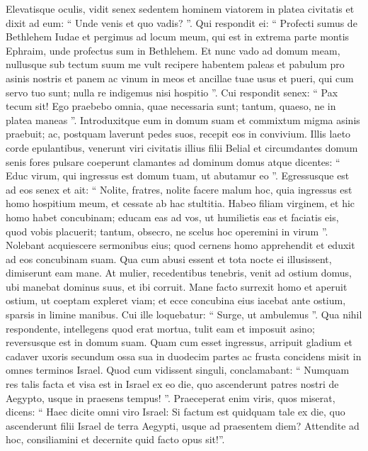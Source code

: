 \begin{biblechapter}
\begin{biblechapter}
\begin{biblechapter}
\begin{biblechapter}
\begin{biblechapter}
\begin{biblechapter}
\begin{biblechapter}
\begin{biblechapter}
\begin{biblechapter}
\begin{biblechapter}
\begin{biblechapter}
\begin{biblechapter}
\begin{biblechapter}
\begin{biblechapter}
\begin{biblechapter}
\begin{biblechapter}
\begin{biblechapter}
\begin{biblechapter}
\begin{biblechapter}
\verse Elevatisque oculis, vidit senex sedentem hominem viatorem in platea civitatis et dixit ad eum: “ Unde venis et quo vadis? ”. 
\verse Qui respondit ei: “ Profecti sumus de Bethlehem Iudae et pergimus ad locum meum, qui est in extrema parte montis Ephraim, unde profectus sum in Bethlehem. Et nunc vado ad domum meam, nullusque sub tectum suum me vult recipere 
\verse habentem paleas et pabulum pro asinis nostris et panem ac vinum in meos et ancillae tuae usus et pueri, qui cum servo tuo sunt; nulla re indigemus nisi hospitio ”. 
\verse Cui respondit senex: “ Pax tecum sit! Ego praebebo omnia, quae necessaria sunt; tantum, quaeso, ne in platea maneas ”. 
\verse Introduxitque eum in domum suam et commixtum migma asinis praebuit; ac, postquam laverunt pedes suos, recepit eos in convivium.
 \verse Illis laeto corde epulantibus, venerunt viri civitatis illius filii Belial et circumdantes domum senis fores pulsare coeperunt clamantes ad dominum domus atque dicentes: “ Educ virum, qui ingressus est domum tuam, ut abutamur eo ”. 
\verse Egressusque est ad eos senex et ait: “ Nolite, fratres, nolite facere malum hoc, quia ingressus est homo hospitium meum, et cessate ab hac stultitia. 
 \verse Habeo filiam virginem, et hic homo habet concubinam; educam eas ad vos, ut humilietis eas et faciatis eis, quod vobis placuerit; tantum, obsecro, ne scelus hoc operemini in virum ”. 
\verse Nolebant acquiescere sermonibus eius; quod cernens homo apprehendit et eduxit ad eos concubinam suam. Qua cum abusi essent et tota nocte ei illusissent, dimiserunt eam mane. 
\verse At mulier, recedentibus tenebris, venit ad ostium domus, ubi manebat dominus suus, et ibi corruit. 
\verse Mane facto surrexit homo et aperuit ostium, ut coeptam expleret viam; et ecce concubina eius iacebat ante ostium, sparsis in limine manibus. 
 \verse Cui ille loquebatur: “ Surge, ut ambulemus ”. Qua nihil respondente, intellegens quod erat mortua, tulit eam et imposuit asino; reversusque est in domum suam. 
\verse Quam cum esset ingressus, arripuit gladium et cadaver uxoris secundum ossa sua in duodecim partes ac frusta concidens misit in omnes terminos Israel. 
\verse Quod cum vidissent singuli, conclamabant: “ Numquam res talis facta et visa est in Israel ex eo die, quo ascenderunt patres nostri de Aegypto, usque in praesens tempus! ”. Praeceperat enim viris, quos miserat, dicens: “ Haec dicite omni viro Israel: Si factum est quidquam tale ex die, quo ascenderunt filii Israel de terra Aegypti, usque ad praesentem diem? Attendite ad hoc, consiliamini et decernite quid facto opus sit!”.
 

\end{biblechapter}
\end{biblechapter}
\end{biblechapter}
\end{biblechapter}
\end{biblechapter}
\end{biblechapter}
\end{biblechapter}
\end{biblechapter}
\end{biblechapter}
\end{biblechapter}
\end{biblechapter}
\end{biblechapter}
\end{biblechapter}
\end{biblechapter}
\end{biblechapter}
\end{biblechapter}
\end{biblechapter}
\end{biblechapter}
\end{biblechapter}
